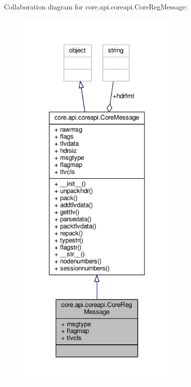 Collaboration diagram for core.\+api.\+coreapi.\+Core\+Reg\+Message\+:
\nopagebreak
\begin{figure}[H]
\begin{center}
\leavevmode
\includegraphics[height=550pt]{classcore_1_1api_1_1coreapi_1_1_core_reg_message__coll__graph}
\end{center}
\end{figure}
